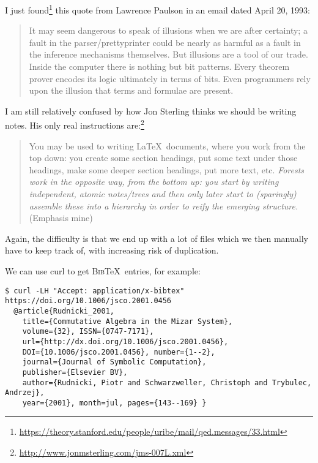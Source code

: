 \begin{node}\label{amn-0008}%
I just found\footnote{\url{https://theory.stanford.edu/people/uribe/mail/qed.messages/33.html}} this quote from Lawrence Paulson
in an email dated April 20, 1993:
\begin{quote}
It may seem dangerous to speak of illusions when we are after certainty; a
fault in the parser/prettyprinter could be nearly as harmful as a fault in the
inference mechanisms themselves.  But illusions are a tool of our trade. 
Inside the computer there is nothing but bit patterns.  Every theorem prover
encodes its logic ultimately in terms of bits.  Even programmers rely upon the
illusion that terms and formulae are present.
\end{quote}
\end{node}

\begin{node}\label{amn-0009}%
I am still relatively confused by how Jon Sterling thinks we should be
writing notes. His only real instructions are:\footnote{\url{http://www.jonmsterling.com/jms-007L.xml}}
\begin{quote}
You may be used to writing \LaTeX\ documents, where you work from the top down: you create some section headings, put some text under those headings, make some deeper section headings, put more text, etc.
\emph{Forests work in the opposite way, from the bottom up: you start by writing independent, atomic notes/trees and then only later start to (sparingly) assemble these into a hierarchy in order to reify the emerging structure.}
(Emphasis mine)
\end{quote}
Again, the difficulty is that we end up with a lot of files which we
then manually have to keep track of, with increasing risk of duplication.
\end{node}

\begin{node}\label{amn-000A}%
  We can use curl to get \textsc{Bib}\TeX\ entries, for example:
\begin{Verbatim}
$ curl -LH "Accept: application/x-bibtex" https://doi.org/10.1006/jsco.2001.0456
  @article{Rudnicki_2001,
    title={Commutative Algebra in the Mizar System},
    volume={32}, ISSN={0747-7171},
    url={http://dx.doi.org/10.1006/jsco.2001.0456},
    DOI={10.1006/jsco.2001.0456}, number={1--2},
    journal={Journal of Symbolic Computation},
    publisher={Elsevier BV},
    author={Rudnicki, Piotr and Schwarzweller, Christoph and Trybulec, Andrzej},
    year={2001}, month=jul, pages={143--169} }
\end{Verbatim}
\end{node}